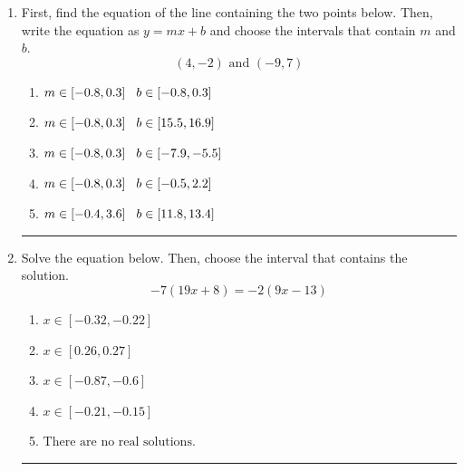 \documentclass[14pt]{extbook}
\newcommand{\litem}[1]{\item#1\hspace*{-1cm}\rule{\textwidth}{0.4pt}}
\begin{document}
\begin{enumerate}
{\begin{enumerate}[label=\Alph*.]
\end{enumerate} }
\litem{
First, find the equation of the line containing the two points below. Then, write the equation as $ y=mx+b $ and choose the intervals that contain $m$ and $b$.\[ (4, -2) \text{ and } (-9, 7) \]\begin{enumerate}[label=\Alph*.]
\item \( m \in [-0.8, 0.3] \hspace*{3mm} b \in [-0.8, 0.3] \)
\item \( m \in [-0.8, 0.3] \hspace*{3mm} b \in [15.5, 16.9] \)
\item \( m \in [-0.8, 0.3] \hspace*{3mm} b \in [-7.9, -5.5] \)
\item \( m \in [-0.8, 0.3] \hspace*{3mm} b \in [-0.5, 2.2] \)
\item \( m \in [-0.4, 3.6] \hspace*{3mm} b \in [11.8, 13.4] \)

\end{enumerate} }
\litem{
Solve the equation below. Then, choose the interval that contains the solution.\[ -7(19x + 8) = -2(9x -13) \]\begin{enumerate}[label=\Alph*.]
\item \( x \in [-0.32, -0.22] \)
\item \( x \in [0.26, 0.27] \)
\item \( x \in [-0.87, -0.6] \)
\item \( x \in [-0.21, -0.15] \)
\item \( \text{There are no real solutions.} \)

\end{enumerate} }
\end{enumerate}
\end{document}
